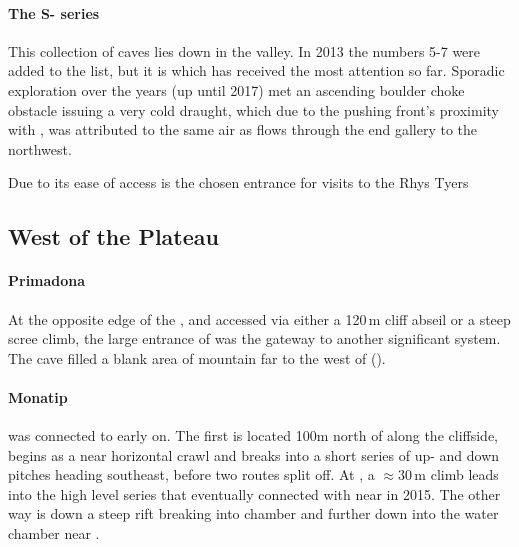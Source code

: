 \paragraph{The S- series}  This collection of caves lies down in   the  valley. In 2013 the numbers 5-7 were added to the list, but it is  which has received the most attention so far. Sporadic exploration over the years (up until 2017) met an ascending boulder choke obstacle issuing a very cold draught, which due to the pushing front's proximity with , was attributed to the same air as flows through the end  gallery to the northwest.

\begin{marginfigure}
\checkoddpage \ifoddpage \forcerectofloat \else \forceversofloat \fi
\centering
 \caption{Due to its ease of access \protect{} is the chosen entrance for visits to the \protect{} \pic Rhys Tyers}
 \label{surfaceM16}
\end{marginfigure}

\subsection{West of the Plateau} 

\paragraph{Primadona} At the opposite edge of the , and accessed via either a 120\,m cliff abseil or a steep scree climb, the large entrance of  was the gateway to another significant system. The cave filled a blank area of mountain far to the west of  ().

\paragraph{Monatip}  was connected to  early on. The first is located 100m north of  along the cliffside, begins as a near horizontal crawl and breaks into a short series of up- and down pitches heading southeast, before two routes split off. At , a $\approx30$\,m climb leads into the high level series that eventually connected with  near  in 2015. The other way is down a steep rift breaking into  chamber and further down into the water chamber near .

